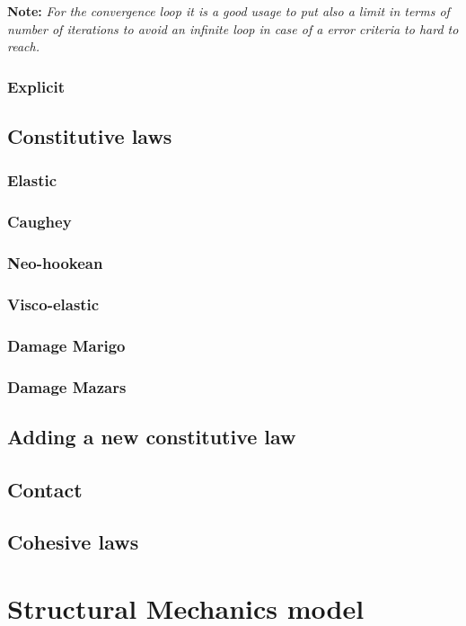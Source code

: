 \documentclass[a4paper,11pt]{book}
\newcommand{\note}[1]{\textbf{Note: }\textit{#1}}
\begin{document}
\note{For the convergence loop  it is a good usage to put  also a limit in terms
  of number of iterations to avoid an  infinite loop in case of a error criteria
  to hard to reach.}

\subsubsection{Explicit}

\subsection{Constitutive laws}
\subsubsection{Elastic}
\subsubsection{Caughey}
\subsubsection{Neo-hookean}
\subsubsection{Visco-elastic}
\subsubsection{Damage Marigo}
\subsubsection{Damage Mazars}

\subsection{Adding a new constitutive law}

\subsection{Contact}

\subsection{Cohesive laws}


\section{Structural Mechanics model}
\end{document}
